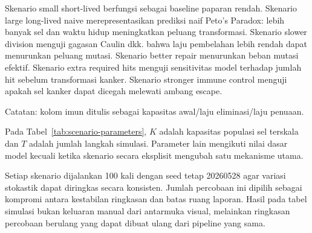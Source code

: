 Skenario small short-lived berfungsi sebagai baseline paparan rendah. Skenario
large long-lived naive merepresentasikan prediksi naif Peto's Paradox: lebih
banyak sel dan waktu hidup meningkatkan peluang transformasi. Skenario slower
division menguji gagasan Caulin dkk. bahwa laju pembelahan lebih rendah dapat
menurunkan peluang mutasi. Skenario better repair menurunkan beban mutasi
efektif. Skenario extra required hits menguji sensitivitas model terhadap
jumlah hit sebelum transformasi kanker. Skenario stronger immune control
menguji apakah sel kanker dapat dicegah melewati ambang escape.

\begin{table}[t]
\centering
\caption{Nilai parameter utama pada skenario simulasi.}
\label{tab:scenario-parameters}
\vspace{0.4ex}
\footnotesize{Catatan: kolom imun ditulis sebagai kapasitas awal/laju eliminasi/laju penuaan.}
\end{table}

Pada Tabel~\ref{tab:scenario-parameters}, $K$ adalah kapasitas populasi sel
terskala dan $T$ adalah jumlah langkah simulasi. Parameter lain mengikuti nilai
dasar model kecuali ketika skenario secara eksplisit mengubah satu mekanisme
utama.

Setiap skenario dijalankan 100 kali dengan seed tetap 20260528 agar variasi
stokastik dapat diringkas secara konsisten. Jumlah percobaan ini dipilih sebagai
kompromi antara kestabilan ringkasan dan batas ruang laporan. Hasil pada tabel
simulasi bukan keluaran manual dari antarmuka visual, melainkan ringkasan
percobaan berulang yang dapat dibuat ulang dari pipeline yang sama.


